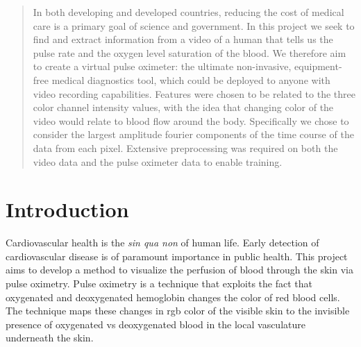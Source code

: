 \documentclass[a0,landscape]{a0poster}
\begin{document}
\vspace{1cm} %


\begin{multicols}{4} %


\color{Navy} %

\begin{abstract}

In both developing and developed countries, reducing the cost of medical care is a primary goal of science and government.
 In this project we seek to find and extract information from a video of a human that tells us the pulse rate and the oxygen level saturation of the blood. 
 We therefore aim to create a virtual pulse oximeter: the ultimate non-invasive, equipment-free medical diagnostics tool, which could be deployed to anyone with video recording capabilities.
 Features were chosen to be related to the three color channel intensity values, with the idea that changing color of the video would relate to blood flow around the body.
 Specifically we chose to consider the largest amplitude fourier components of the time course of the data from each pixel.
 Extensive preprocessing was required on both the video data and the pulse oximeter data to enable training.

\end{abstract}

\color{SaddleBrown} %

\section*{Introduction}

Cardiovascular health is the \emph{sin qua non} of human life. Early detection of cardiovascular disease is of paramount importance in public health. This project aims to develop a method to visualize the perfusion of blood through the skin via pulse oximetry. Pulse oximetry is a technique that exploits the fact that oxygenated and deoxygenated hemoglobin changes the color of red blood cells. The technique maps these changes in rgb color of the visible skin to the invisible presence of oxygenated vs deoxygenated blood in the local vasculature underneath the skin.


\end{multicols}
\end{document}
